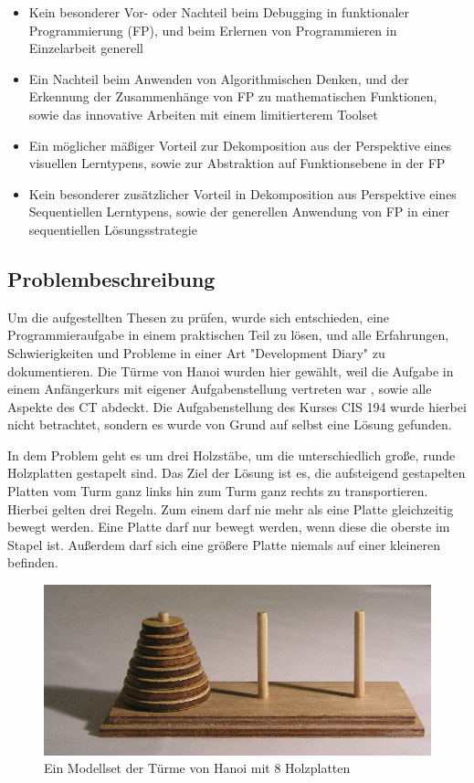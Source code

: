 \begin{itemize}
    \item Kein besonderer Vor- oder Nachteil beim Debugging in funktionaler Programmierung (FP), und beim Erlernen von Programmieren in Einzelarbeit generell
    \item Ein Nachteil beim Anwenden von Algorithmischen Denken, und der Erkennung der Zusammenhänge von FP zu mathematischen Funktionen, sowie das innovative Arbeiten mit einem limitierterem Toolset
    \item Ein möglicher mäßiger Vorteil zur Dekomposition aus der Perspektive eines visuellen Lerntypens, sowie zur Abstraktion auf Funktionsebene in der FP
    \item Kein besonderer zusätzlicher Vorteil in Dekomposition aus Perspektive eines Sequentiellen Lerntypens, sowie der generellen Anwendung von FP in einer sequentiellen Lösungsstrategie
\end{itemize}

\subsection{Problembeschreibung}\label{sec:problemdesc}
Um die aufgestellten Thesen zu prüfen, wurde sich entschieden, eine Programmieraufgabe in einem praktischen Teil zu lösen, und alle Erfahrungen, Schwierigkeiten und Probleme in einer Art "Development Diary" zu dokumentieren.
Die Türme von Hanoi wurden hier gewählt, weil die Aufgabe in einem Anfängerkurs mit eigener Aufgabenstellung vertreten war \cite{cis194}, sowie alle Aspekte des CT abdeckt. Die Aufgabenstellung des Kurses CIS 194 wurde hierbei nicht betrachtet, sondern es wurde von Grund auf selbst eine Lösung gefunden.

In dem Problem geht es um drei Holzstäbe, um die unterschiedlich große, runde Holzplatten gestapelt sind. Das Ziel der Lösung ist es, die aufsteigend gestapelten Platten vom Turm ganz links hin zum Turm ganz rechts zu transportieren. Hierbei gelten drei Regeln. Zum einem darf nie mehr als eine Platte gleichzeitig bewegt werden. Eine Platte darf nur bewegt werden, wenn diese die oberste im Stapel ist. Außerdem darf sich eine größere Platte niemals auf einer kleineren befinden.

\begin{figure}[H]
    \centering
    \includegraphics[width=1\linewidth]{Figures/Section_4/hanoi}
    \caption{Ein Modellset der Türme von Hanoi mit 8 Holzplatten \protect\cite{wikicommons}}
\end{figure}

